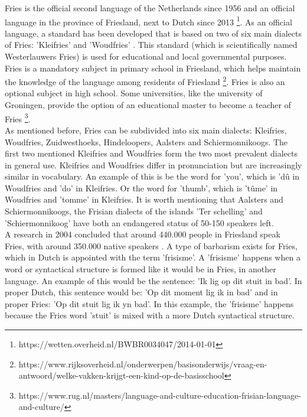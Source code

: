 \documentclass[
10pt, %
a4paper, %
oneside, %
headinclude,footinclude, %
] {book}%
\begin{document}
Fries is the official second language of the Netherlands since 1956 and an official language in the province of Friesland, next to Dutch since 2013 \footnote{https://wetten.overheid.nl/BWBR0034047/2014-01-01}. As an official language, a standard has been developed that is based on two of six main dialects of Fries: 'Kleifries' and 'Woudfries' \citep{streektalen}. This standard (which is scientifically named Westerlauwers Fries) is used for educational and local governmental purposes. Fries is a mandatory subject in primary school in Friesland, which helps maintain the knowledge of the language among residents of Friesland \footnote{https://www.rijksoverheid.nl/onderwerpen/basisonderwijs/vraag-en-antwoord/welke-vakken-krijgt-een-kind-op-de-basisschool}. Fries is also an optional subject in high school. Some universities, like the university of Groningen, provide the option of an educational master to become a teacher of Fries \footnote{https://www.rug.nl/masters/language-and-culture-education-frisian-language-and-culture/}. \\

As mentioned before, Fries can be subdivided into six main dialects: Kleifries, Woudfries, Zuidwesthoeks, Hindeloopers, Aalsters and Schiermonnikoogs. The first two mentioned Kleifries and Woudfries form the two most prevalent dialects in general use. \citep{streektalen} Kleifries and Woudfries differ in pronunciation but are increasingly similar in vocabulary. An example of this is be the word for 'you', which is 'd\^{u} in Woudfries and 'do' in Kleifries. Or the word for 'thumb', which is 't\^{u}me' in Woudfries and 'tomme' in Kleifries.   It is worth mentioning that Aalsters and Schiermonnikoogs, the Frisian dialects of the islands 'Ter schelling' and 'Schiermonnikoog' have both an endangered status of 50-150 speakers left. \citep{streektalen} \\

A research in 2004 concluded that around 440.000 people in Friesland speak Fries, with around 350.000 native speakers \citep{lewis}. A type of barbarism exists for Fries, which in Dutch is appointed with the term 'frisisme'. A 'frisisme' happens when a word or syntactical structure is formed like it would be in Fries, in another language. An example of this would be the sentence: 'Ik lig op dit stuit in bad'. In proper Dutch, this sentence would be: 'Op dit moment lig ik in bad' and in proper Fries: 'Op dit stuit lig ik yn bad'. In this example, the 'frisisme' happens because the Fries word 'stuit' is mixed with a more Dutch syntactical structure. \\
\end{document}
